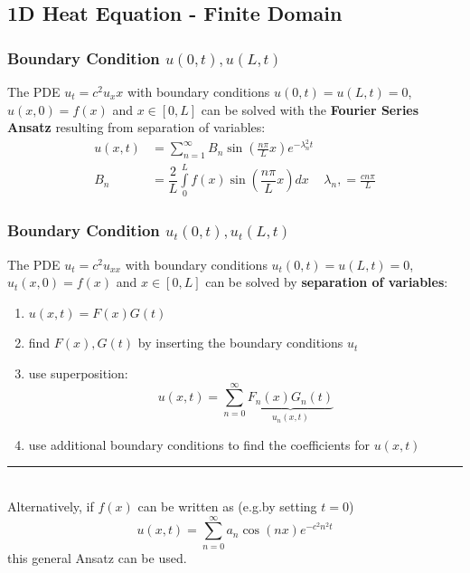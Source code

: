 \subsection{1D Heat Equation - Finite Domain}
\subsubsection{Boundary Condition $u(0,t), u(L,t)$}
The PDE $u_t=c^2u_xx$ with boundary conditions $u(0,t)=u(L,t)=0$, $u(x,0)=f(x)$
and $x\in[0,L]$ can be solved with the \textbf{Fourier Series Ansatz} resulting
from separation of variables:
\begin{align*}
    u(x,t) & =\sum_{n=1}^\infty B_n\sin(\frac{n\pi}Lx)e^{-\lambda_n^2t}                                \\
    B_n    & =\dfrac{2}{L}\int\limits_0^{L}f(x)\sin(\dfrac{n\pi}{L}x)dx & \lambda_n, = \frac{cn\pi}{L}
\end{align*}

\subsubsection{Boundary Condition $u_{t}(0,t),u_{t}(L,t)$}
The PDE $u_{t}=c^2u_{xx}$ with boundary conditions $u_t(0,t)=u(L,t)=0$, $u_t(x,0)=f(x)$
and $x\in[0,L]$ can be solved by \textbf{separation of variables}:
\begin{enumerate}
    \item $u(x,t)=F(x)G(t)$
    \item find $F(x),G(t)$ by inserting the boundary conditions $u_t$
    \item use superposition:
          \begin{equation*}
              u(x,t)=\sum_{n=0}^{\infty} \underbrace{F_n(x)G_n(t)}_{u_n(x,t)}
          \end{equation*}
    \item use additional boundary conditions to find the coefficients for $u(x,t)$
\end{enumerate}
{\color{gray}\hrule}\, \\
Alternatively, if $f(x)$ can be written as (e.g.\@ by setting $t = 0$)
\begin{equation*}
    u(x,t)=\sum_{n=0}^{\infty}a_n\cos(nx)e^{-c^2n^2t}
\end{equation*}
this general Ansatz can be used.
